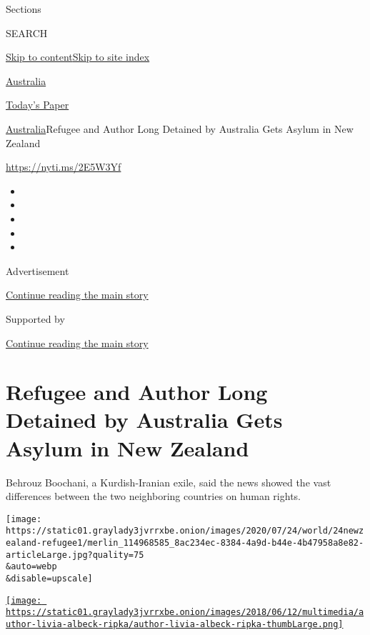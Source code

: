 Sections

SEARCH

\protect\hyperlink{site-content}{Skip to
content}\protect\hyperlink{site-index}{Skip to site index}

\href{https://www.nytimes3xbfgragh.onion/section/world/australia}{Australia}

\href{https://myaccount.nytimes3xbfgragh.onion/auth/login?response_type=cookie\&client_id=vi}{}

\href{https://www.nytimes3xbfgragh.onion/section/todayspaper}{Today's
Paper}

\href{/section/world/australia}{Australia}\textbar{}Refugee and Author
Long Detained by Australia Gets Asylum in New Zealand

\url{https://nyti.ms/2E5W3Yf}

\begin{itemize}
\item
\item
\item
\item
\item
\end{itemize}

Advertisement

\protect\hyperlink{after-top}{Continue reading the main story}

Supported by

\protect\hyperlink{after-sponsor}{Continue reading the main story}

\hypertarget{refugee-and-author-long-detained-by-australia-gets-asylum-in-new-zealand}{%
\section{Refugee and Author Long Detained by Australia Gets Asylum in
New
Zealand}\label{refugee-and-author-long-detained-by-australia-gets-asylum-in-new-zealand}}

Behrouz Boochani, a Kurdish-Iranian exile, said the news showed the vast
differences between the two neighboring countries on human rights.

\texttt{[image: https://static01.graylady3jvrrxbe.onion/images/2020/07/24/world/24newzealand-refugee1/merlin\_114968585\_8ac234ec-8384-4a9d-b44e-4b47958a8e82-articleLarge.jpg?quality=75\\\&auto=webp\\\&disable=upscale]}

\href{https://www.nytimes3xbfgragh.onion/by/livia-albeck-ripka}{\texttt{[image: https://static01.graylady3jvrrxbe.onion/images/2018/06/12/multimedia/author-livia-albeck-ripka/author-livia-albeck-ripka-thumbLarge.png]}}

